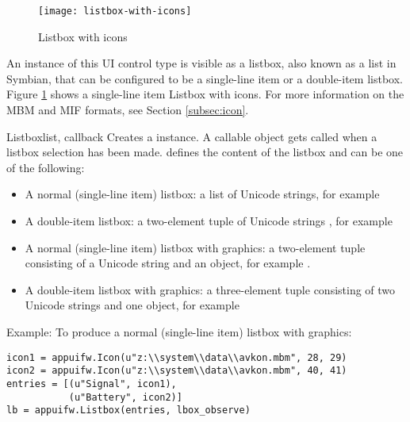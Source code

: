 \begin{figure}[htbp]
\centering
\texttt{[image: listbox-with-icons]}
\caption{Listbox with icons}
\label{fig:listbox-with-icons}
\end{figure}

An instance of this UI control type is visible as a listbox, also known as a 
list in Symbian, that can be configured to be a single-line item or a 
double-item listbox. Figure \ref{fig:listbox-with-icons} shows a single-line 
item Listbox with icons. For more information on the MBM and MIF formats, 
see Section \ref{subsec:icon}.

\begin{classdesc}{Listbox}{list, callback}
Creates a  instance. A callable object 
 gets called when a listbox selection has been 
made.  defines the content of the listbox and can be one of the 
following:

\begin{itemize}
\item A normal (single-line item) listbox: a list of Unicode strings, for example 
\item A double-item listbox: a two-element tuple of Unicode strings , for example 
\item A normal (single-line item) listbox with graphics: a two-element tuple consisting of a Unicode string and an  object, for example .
\item A double-item listbox with graphics: a three-element tuple consisting of two Unicode strings and one  object, for example 
\end{itemize}

Example: To produce a normal (single-line item) listbox with graphics:
\begin{verbatim}
icon1 = appuifw.Icon(u"z:\\system\\data\\avkon.mbm", 28, 29)
icon2 = appuifw.Icon(u"z:\\system\\data\\avkon.mbm", 40, 41)
entries = [(u"Signal", icon1),
           (u"Battery", icon2)]
lb = appuifw.Listbox(entries, lbox_observe)
\end{verbatim}
\end{classdesc}


